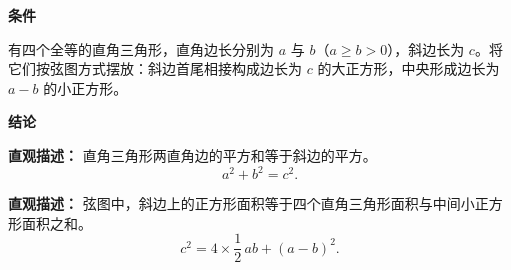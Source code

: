 \begin{statementbox}
	\textbf{\textcolor{CStatement}{条件}}
	\begin{description}[style=nextline, leftmargin=2.8em, labelsep=0.5em, itemsep=0.35em]
		\item[\textbf{\textcolor{CStatement}{条件 1（图形条件）：}}]
			有四个全等的直角三角形，直角边长分别为 $a$ 与 $b$（$a\ge b>0$），斜边长为 $c$。将它们按弦图方式摆放：斜边首尾相接构成边长为 $c$ 的大正方形，中央形成边长为 $a-b$ 的小正方形。
	\end{description}
	\textbf{\textcolor{CStatement}{结论}}
	\begin{description}[style=nextline, leftmargin=2.8em, labelsep=0.5em, itemsep=0.45em]
		\item[\textbf{\textcolor{CStatement}{结论一（勾股定理）：}}]
			\textbf{\textcolor{CStatement}{直观描述：}}
			直角三角形两直角边的平方和等于斜边的平方。
			\[
				a^2 + b^2 = c^2 .
			\]
		\item[\textbf{\textcolor{CStatement}{常见变形（面积恒等式）：}}]
			\textbf{\textcolor{CStatement}{直观描述：}}
			弦图中，斜边上的正方形面积等于四个直角三角形面积与中间小正方形面积之和。
			\[
				c^2 = 4 \times \frac{1}{2}\,ab + (a-b)^2 .
			\]
	\end{description}

\end{statementbox}
